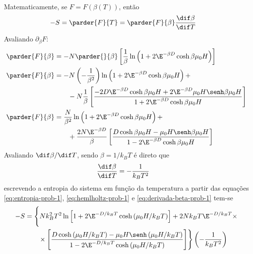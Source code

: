 \begin{prob}
\begin{sol}
\begin{enumerate}[label=\alph *)]
\begin{align}
      \end{align}
      Matematicamente, se $F=F(\beta (T))$, então
      \begin{align}
        \label{eq:entropia-prob-1}
        -S&=\parder{F}{T}=\parder{F}{\beta}\frac{\dif\beta}{\dif T}
      \end{align}
      Avaliando $\partial_\beta F$:
      \begin{align}
        \label{eq:hemlholtz-prob-1}
        \begin{split}
          \parder{F}{\beta}&=-N\parder{}{\beta}\left[\frac{1}{\beta}\ln\left(1+2\E^{-\beta D}\cosh\beta\mu_0H\right)\right]\\
          \parder{F}{\beta}&=-N\left(-\frac{1}{\beta^2}\right)\ln\left(1+2\E^{-\beta D}\cosh\beta\mu_0H\right)+\\
          &\qquad-N\frac{1}{\beta}\left[\frac{-2D\E^{-\beta D}\cosh\beta\mu_0H+2\E^{-\beta D}\mu_0H\senh\beta\mu_0H}{1+2\E^{-\beta D}\cosh\beta\mu_0H}\right]\\
          \parder{F}{\beta}&=\frac{N}{\beta^2}\ln\left(1+2\E^{-\beta D}\cosh\beta\mu_0H\right)+\\
          &\qquad+\frac{2N\E^{-\beta D}}{\beta}\left[\frac{D\cosh\beta\mu_0H-\mu_0H\senh\beta\mu_0H}{1-2\E^{-\beta D}\cosh\beta\mu_0H}\right]
        \end{split}
      \end{align}
      Avaliando $\dif\beta/\dif T$, sendo $\beta=1/k_BT$ é direto que
      \begin{align}
        \label{eq:derivada-beta-prob-1}
        \frac{\dif\beta}{\dif T}&=-\frac{1}{k_BT^2}
      \end{align}
      escrevendo a entropia do sistema em função da temperatura a partir das equações \eqref{eq:entropia-prob-1}, \eqref{eq:hemlholtz-prob-1} e \eqref{eq:derivada-beta-prob-1} tem-se      
      \begin{align}
        \begin{split}
          -S&=\Biggl\{Nk_B^2T^2\ln\left[1+2\E^{-D/k_BT}\cosh\left(\mu_0H/k_BT\right)\right]+2Nk_BT\E^{-D/k_BT}\times\\
           &\qquad\times\left[\frac{D\cosh\left(\mu_0H/k_BT\right)-\mu_0H\senh\left(\mu_0H/k_BT\right)}{1-2\E^{-D/k_BT}\cosh\left(\mu_0H/k_BT\right)}\right]\Biggr\}\left(-\frac{1}{k_BT^2}\right)\\
        \end{split}
      \end{align}
      \begin{align}

\end{align}
\end{enumerate}
\end{sol}
\end{prob}
